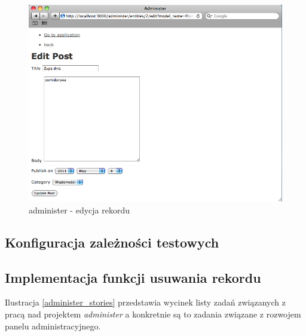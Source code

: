 	\begin{figure}[!h]
		\begin{center}
			\includegraphics[width=\linewidth]{images/administer_edit.png}
			\caption{administer - edycja rekordu}
			\label{administer_edit}
		\end{center}
	\end{figure}
  
  \subsection{Konfiguracja zależności testowych}
    
  \subsection{Implementacja funkcji usuwania rekordu}
    
    Ilustracja \ref{administer_stories}  przedstawia wycinek listy zadań związanych z pracą nad projektem \emph{administer} a konkretnie są to zadania związane z rozwojem panelu administracyjnego.
    
    \clearpage
    
